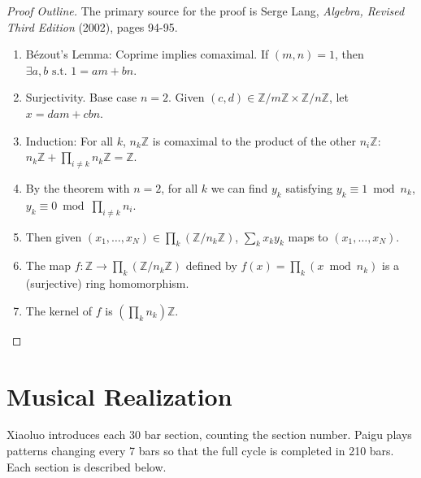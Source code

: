 \documentclass[12pt]{article}
\begin{document}
\begin{proof}[Proof Outline]
  The primary source for the proof is Serge Lang, \textit{Algebra,
    Revised Third Edition} (2002), pages 94-95.
  \begin{enumerate}
    \item Bézout’s Lemma: Coprime implies comaximal. If $(m,n) = 1$,
      then $\exists a,b \text{ s.t. } 1 = am + bn$.
    \item Surjectivity. Base case $n=2$. Given $(c,d) \in \mathbb{Z} /
      m\mathbb{Z} \times \mathbb{Z} / n\mathbb{Z}$, let $x =dam + cbn$.
    \item Induction: For all $k$, $n_k\mathbb{Z}$ is comaximal to the
      product of the other $n_i\mathbb{Z}$: $n_k\mathbb{Z} + \prod_{i
      \ne k}n_k\mathbb{Z} = \mathbb{Z}$.
    \item By the theorem with $n=2$, for all $k$ we can find $y_k$
      satisfying $y_k \equiv 1 \bmod n_k$, $y_k \equiv 0 \bmod \prod_{i\ne
        k}n_i$.
    \item Then given $(x_1,\ldots,x_N) \in \prod_k (\mathbb{Z} /
      n_k\mathbb{Z})$, $\sum_k x_ky_k$ maps to $(x_1,\ldots,x_N)$.
    \item The map $f : \mathbb{Z} \to \prod_k (\mathbb{Z} /
      n_k\mathbb{Z})$ defined by $f(x) = \prod_k (x \bmod n_k)$ is a
      (surjective) ring homomorphism.
    \item The kernel of $f$ is $(\prod_k n_k)\mathbb{Z}$.
  \end{enumerate}
\end{proof}

\section{Musical Realization}

Xiaoluo introduces each 30 bar section, counting the section
number. Paigu plays patterns changing every 7 bars so that the full
cycle is completed in 210 bars. Each section is described below.
\end{document}
